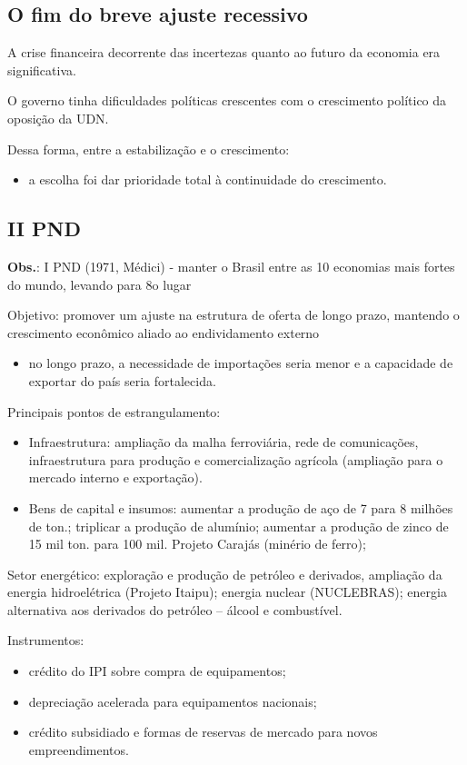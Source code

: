 \documentclass[a4paper,12pt]{article}[abntex2]
\begin{document}
\subsection{\textbf{O fim do breve ajuste recessivo}}
A crise financeira decorrente das incertezas quanto ao futuro da economia era significativa. 

O governo tinha dificuldades políticas crescentes com o crescimento político da oposição da UDN. 

Dessa forma, entre a estabilização e o crescimento:\begin{itemize}
    \item a escolha foi dar prioridade total à continuidade do crescimento.
\end{itemize}

\subsection{\textbf{II PND}}
\textbf{Obs.}: I PND (1971, Médici) - manter o Brasil entre as 10 economias mais fortes do mundo, levando para 8o lugar

Objetivo: promover um ajuste na estrutura de oferta de longo prazo, mantendo o crescimento econômico aliado ao endividamento externo\begin{itemize}
    \item no longo prazo, a necessidade de importações seria menor e a capacidade de exportar do país seria fortalecida.
\end{itemize}

Principais pontos de estrangulamento:\begin{itemize}
    \item Infraestrutura: ampliação da malha ferroviária, rede de comunicações, infraestrutura para produção e comercialização agrícola (ampliação para o mercado interno e exportação).
    \item Bens de capital e insumos: aumentar a produção de aço de 7 para 8 milhões de ton.; triplicar a produção de alumínio; aumentar a produção de zinco de 15 mil ton. para 100 mil. Projeto Carajás (minério de ferro);
\end{itemize}

Setor energético: exploração e produção de petróleo e derivados, ampliação da energia hidroelétrica (Projeto Itaipu); energia nuclear (NUCLEBRAS); energia alternativa aos derivados do petróleo – álcool e combustível.

Instrumentos: \begin{itemize}
    \item crédito do IPI sobre compra de equipamentos; 
    \item depreciação acelerada para equipamentos nacionais; 
    \item crédito subsidiado e formas de reservas de mercado para novos empreendimentos.
\end{itemize}
\end{document}
